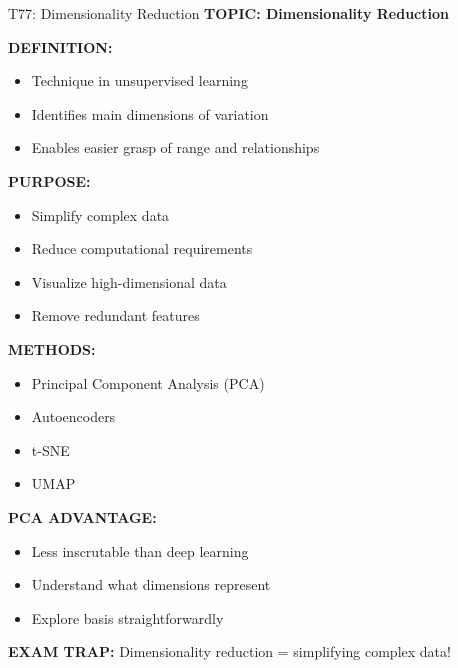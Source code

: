 \documentclass[8pt]{beamer}
\begin{document}
	\begin{frame}{T77: Dimensionality Reduction}
		\fontsize{6.5}{7.5}\selectfont
		\textbf{TOPIC: Dimensionality Reduction}
		
		\vspace{0.1cm}
		\textbf{DEFINITION:}
		\begin{itemize}
			\item Technique in unsupervised learning
			\item Identifies main dimensions of variation
			\item Enables easier grasp of range and relationships
		\end{itemize}
		
		\vspace{0.1cm}
		\textbf{PURPOSE:}
		\begin{itemize}
			\item Simplify complex data
			\item Reduce computational requirements
			\item Visualize high-dimensional data
			\item Remove redundant features
		\end{itemize}
		
		\vspace{0.1cm}
		\textbf{METHODS:}
		\begin{itemize}
			\item Principal Component Analysis (PCA)
			\item Autoencoders
			\item t-SNE
			\item UMAP
		\end{itemize}
		
		\vspace{0.1cm}
		\textbf{PCA ADVANTAGE:}
		\begin{itemize}
			\item Less inscrutable than deep learning
			\item Understand what dimensions represent
			\item Explore basis straightforwardly
		\end{itemize}
		
		\textcolor{myred}{\textbf{EXAM TRAP:}} Dimensionality reduction = \textcolor{myblue}{simplifying complex data}!
	\end{frame}
	
\end{document}
